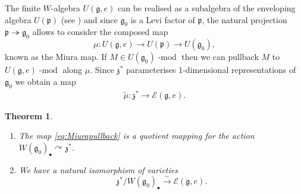 \documentclass[twoside,12pt,reqno]{amsart}
\newtheorem{Theorem}{Theorem}[section]
\theoremstyle{remark}
\numberwithin{equation}{section}
\def\isoto{\overset{\sim}{\longrightarrow}}
\def\lmod{\!\operatorname{-mod}}
\def\g{{\mathfrak g}}
\def\p{\mathfrak p}
\def\z{\mathfrak{z}}
\def\E{\mathcal{E}}
\begin{document}
The finite $W$-algebra $U(\g,e)$ can be realised as a subalgebra of the enveloping algebra $U(\p)$ (see  \cite[§2.6]{GT}) and since $\g_0$ is  a Levi factor of $\p$, the natural projection $\p \twoheadrightarrow \g_0$ allows to  consider
    the  composed map
$$\mu : U(\g,e) \to U(\p) \to U(\g_0),$$
 known as the Miura map.
If $M \in U(\g_0)\lmod$ then we can pullback $M$ to $U(\g,e)\lmod$ along $\mu$. 
Since $\z^*$ parameterises 1-dimensional representations of $\g_0$ we obtain a map
\begin{eqnarray}
\label{eq:Miurapullback}
\tilde\mu : \z^* \to \E(\g,e).
\end{eqnarray}


\begin{Theorem}
\label{T:OnedimensionalsviaMiura}
\begin{enumerate}
    \item The map \eqref{eq:Miurapullback} is a quotient mapping for the action $W(\g_0)_\bullet \curvearrowright \z^*$.


    \item We have a natural isomorphism of varieties
   $$\z^* / W(\g_0)_\bullet \isoto \E(\g,e).$$
\end{enumerate}
\end{Theorem}
\end{document}

